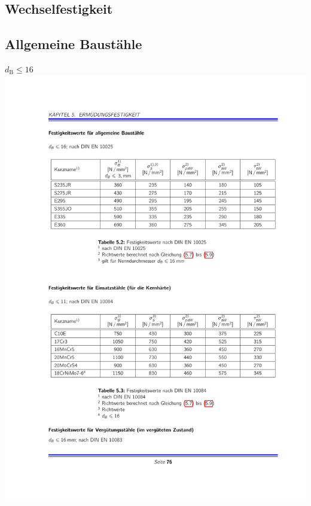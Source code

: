 \begin{multicols}{3}
	\section{Wechselfestigkeit} %
		\subsection{Allgemeine Baustähle} %
			\label{baustaehle}
			$d_{\text{B}} \leq 16$ \\
			\includegraphics[width=\columnwidth]{graphics/baustaehle}

\end{multicols}

